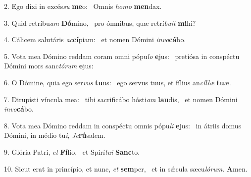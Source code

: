 2. Ego dixi in excés\textit{su} \textbf{me}o: \ast\  Omnis \textit{ho}\textit{mo} \textbf{men}dax.\

3. Quid retríbu\textit{am} \textbf{Dó}mino, \ast\  pro ómnibus, quæ retrí\textit{bu}\textit{it} \textbf{mi}hi?\

4. Cálicem salutáris \textit{ac}\textbf{cí}piam: \ast\  et nomen Dómini \textit{in}\textit{vo}\textbf{cá}bo.\

5. Vota mea Dómino reddam coram omni pópu\textit{lo} \textbf{e}jus: \ast\  pretiósa in conspéctu Dómini mors sanc\textit{tó}\textit{rum} \textbf{e}jus:\

6. O Dómine, quia ego ser\textit{vus} \textbf{tu}us: \ast\  ego servus tuus, et fílius an\textit{cíl}\textit{læ} \textbf{tu}æ.\

7. Dirupísti víncula mea: \dag\  tibi sacrificábo hósti\textit{am} \textbf{lau}dis, \ast\  et nomen Dómini \textit{in}\textit{vo}\textbf{cá}bo.\

8. Vota mea Dómino reddam in conspéctu omnis pópu\textit{li} \textbf{e}jus: \ast\  in átriis domus Dómini, in médio tu\textit{i}, \textit{Je}\textbf{rú}salem.\

9. Glória Patri, \textit{et} \textbf{Fí}lio, \ast\  et Spirí\textit{tu}\textit{i} \textbf{Sanc}to.\

10. Sicut erat in princípio, et nunc, \textit{et} \textbf{sem}per, \ast\  et in sǽcula sæcu\textit{ló}\textit{rum}. \textbf{A}men.\

